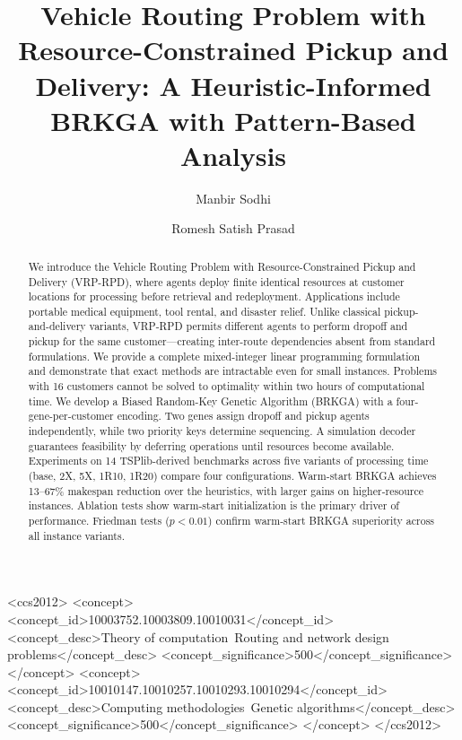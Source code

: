 \documentclass[sigconf]{acmart}
\begin{document}
\title[VRP-RPD: A Heuristic-Informed BRKGA with Pattern-Based Analysis]{Vehicle Routing Problem with Resource-Constrained Pickup and Delivery: A Heuristic-Informed BRKGA with Pattern-Based Analysis}


\author{Manbir Sodhi}
\author{Romesh Satish Prasad}
\renewcommand{\shortauthors}{Author}

\begin{abstract}
We introduce the Vehicle Routing Problem with Resource-Constrained Pickup and Delivery (VRP-RPD), where agents deploy finite identical resources at customer locations for processing before retrieval and redeployment. Applications include portable medical equipment, tool rental, and disaster relief. Unlike classical pickup-and-delivery variants, VRP-RPD permits different agents to perform dropoff and pickup for the same customer—creating inter-route dependencies absent from standard formulations. We provide a complete mixed-integer linear programming formulation and demonstrate that exact methods are intractable even for small instances. Problems with 16 customers cannot be solved to optimality within two hours of computational time. We develop a Biased Random-Key Genetic Algorithm (BRKGA) with a four-gene-per-customer encoding. Two genes assign dropoff and pickup agents independently, while two priority keys determine sequencing. A simulation decoder guarantees feasibility by deferring operations until resources become available. Experiments on 14 TSPlib-derived benchmarks across five variants of processing time (base, 2X, 5X, 1R10, 1R20) compare four configurations. Warm-start BRKGA achieves 13–67\% makespan reduction over the heuristics, with larger gains on higher-resource instances. Ablation tests show warm-start initialization is the primary driver of performance. Friedman tests ($p < 0.01$) confirm warm-start BRKGA superiority across all instance variants.
\end{abstract}

\begin{CCSXML}
<ccs2012>
   <concept>
       <concept_id>10003752.10003809.10010031</concept_id>
       <concept_desc>Theory of computation~Routing and network design problems</concept_desc>
       <concept_significance>500</concept_significance>
   </concept>
   <concept>
       <concept_id>10010147.10010257.10010293.10010294</concept_id>
       <concept_desc>Computing methodologies~Genetic algorithms</concept_desc>
       <concept_significance>500</concept_significance>
   </concept>
</ccs2012>
\end{CCSXML}
\end{document}
